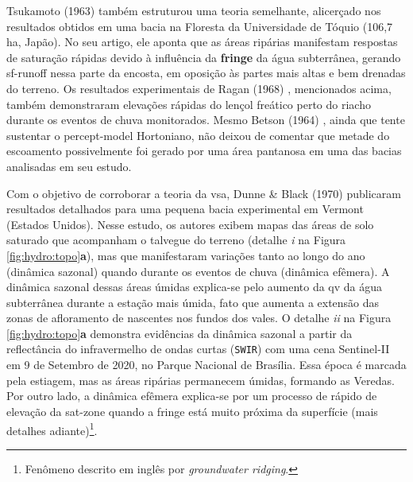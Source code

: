 \documentclass[./main.tex]{subfiles}
\begin{document}
\noindent Tsukamoto (1963) \cite{Tsukamoto1963} também estruturou uma \gls{teoria} semelhante, alicerçado nos resultados obtidos em uma bacia na Floresta da Universidade de Tóquio (106,7 ha, Japão). No seu artigo, ele aponta que as áreas ripárias manifestam respostas de saturação rápidas devido à influência da \textbf{\gls{fringe}} da água subterrânea, gerando \gls{sf-runoff} nessa parte da encosta, em oposição às partes mais altas e bem drenadas do terreno. Os resultados experimentais de Ragan (1968) \cite{Ragan1968}, mencionados acima, também demonstraram elevações rápidas do lençol freático perto do riacho durante os eventos de chuva monitorados. Mesmo Betson (1964) \cite{Betson1964}, ainda que tente sustentar o \gls{percept-model} Hortoniano, não deixou de comentar que metade do escoamento possivelmente foi gerado por uma área pantanosa em uma das bacias analisadas em seu estudo.

\par Com o objetivo de corroborar a \gls{teoria} da \gls{vsa}, Dunne \& Black (1970) \cite{Dunne1970, Dunne1970b} publicaram resultados detalhados para uma pequena bacia experimental em Vermont (Estados Unidos). Nesse estudo, os autores exibem mapas das áreas de solo saturado que acompanham o talvegue do terreno (detalhe \textit{i} na Figura \ref{fig:hydro:topo}\textbf{a}), mas que manifestaram variações tanto ao longo do ano (dinâmica sazonal) quando durante os eventos de chuva (dinâmica efêmera). A dinâmica sazonal dessas áreas úmidas explica-se pelo aumento da \gls{qv} da água subterrânea durante a estação mais úmida, fato que aumenta a extensão das zonas de afloramento de nascentes nos fundos dos vales. O detalhe \textit{ii} na Figura \ref{fig:hydro:topo}\textbf{a} demonstra evidências da dinâmica sazonal a partir da reflectância do infravermelho de ondas curtas (\texttt{SWIR}) com uma cena Sentinel-II em 9 de Setembro de 2020, no Parque Nacional de Brasília. Essa época é marcada pela estiagem, mas as áreas ripárias permanecem úmidas, formando as Veredas. Por outro lado, a dinâmica efêmera explica-se por um processo de rápido de elevação da \gls{sat-zone} quando a \gls{fringe} está muito próxima da superfície (mais detalhes adiante)\footnote{Fenômeno descrito em inglês por \textit{groundwater ridging}.}. 
\end{document}
